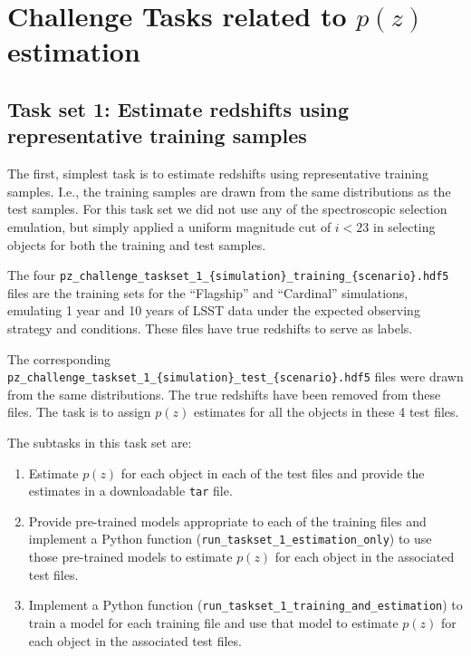 \section{\texorpdfstring{Challenge Tasks related to $p(z)$ estimation}{Challenge Tasks related to p(z) estimation}}
\label{sec:tasks}

\subsection{Task set 1: Estimate redshifts using representative
  training samples}

The first, simplest task is to estimate redshifts using
representative training samples. I.e., the training samples are drawn
from the same distributions as the test samples. For this task set we
did not use any of the spectroscopic selection emulation, but simply
applied a uniform magnitude cut of $i < 23$ in selecting objects for both
the training and test samples.

The four 
\texttt{pz\_challenge\_taskset\_1\_\{simulation\}\_training\_\{scenario\}.hdf5}
files are the training sets for the ``Flagship'' and ``Cardinal''
simulations, emulating 1 year and 10 years of LSST data under the
expected observing strategy and conditions. These files have true
redshifts to serve as labels.

The corresponding 
\texttt{pz\_challenge\_taskset\_1\_\{simulation\}\_test\_\{scenario\}.hdf5}
files were \allowbreak drawn from the same distributions. The true redshifts have
been removed from these files. The task is to assign $p(z)$
estimates for all the objects in these 4 test files.

The subtasks in this task set are:

\begin{enumerate}
  \item{Estimate $p(z)$ for each object in each of the test files and
      provide the estimates in a downloadable \texttt{tar} file.}
  \item{Provide pre-trained models appropriate to each of the training
      files and implement a Python function (\texttt{run\_taskset\_1\_estimation\_only}) to use those
      pre-trained models to estimate $p(z)$ for each object in the
      associated test files.}    
  \item{Implement a Python function (\texttt{run\_taskset\_1\_training\_and\_estimation}) to train a model for
      each training file and use that model to estimate $p(z)$ for
      each object in the associated test files.}    
\end{enumerate}


